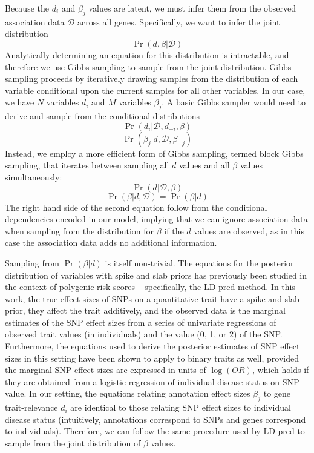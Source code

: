 Because the $d_i$ and $\beta_j$ values are latent, we must infer them
from the observed association data $\mathcal{D}$ across all
genes. Specifically, we want to infer the joint distribution
\[\Pr\left(d,\beta|\mathcal{D}\right)\]
Analytically determining an equation for this distribution is intractable, and therefore
we use Gibbs sampling to sample from the joint distribution. Gibbs
sampling proceeds by iteratively drawing samples from the
distribution of each variable conditional upon the current samples for
all other variables. In our case, we have $N$ variables $d_i$ and $M$
variables $\beta_j$. A basic Gibbs sampler would 
need to derive and sample from the conditional distributions
\[\Pr\left(d_i|\mathcal{D},d_{-i},\beta\right)\]
\[\Pr\left(\beta_j|d,\mathcal{D},\beta_{-j}\right)\]
Instead, we employ a more efficient form of Gibbs sampling, termed
block Gibbs sampling, that iterates between sampling all $d$ values
and all $\beta$ values simultaneously:
\[\Pr\left(d|\mathcal{D},\beta\right)\]
\[\Pr\left(\beta|d,\mathcal{D}\right)=\Pr\left(\beta|d\right)\]
The right hand side of the second equation follow from the
conditional dependencies encoded in our model, implying that we
can ignore association data when sampling from the distribution for
$\beta$ if the $d$ values are observed, as in this case the
association data adds no additional information.

Sampling from $\Pr\left(\beta|d\right)$ is itself non-trivial. The
equations for the posterior distribution of variables with spike and slab
priors has previously been studied in the context of polygenic risk
scores -- specifically, the LD-pred method\cite{}. In this work, the
true effect sizes of SNPs on a quantitative trait have a spike and
slab prior, they affect the trait additively, and the observed data is
the marginal estimates of the SNP effect sizes from a series of
univariate regressions of observed trait values (in individuals) and
the value (0, 1, or 2) of the SNP. Furthermore, the equations used to
derive the posterior estimates of SNP effect sizes in this setting
have been shown to apply to binary traits as well, provided the
marginal SNP effect sizes are expressed in units of $\log(OR)$\cite{}, which
holds if they are obtained from a logistic regression of individual
disease status on SNP value. In our setting, the equations relating
annotation effect sizes $\beta_j$ to gene trait-relevance $d_i$ are
identical to those relating SNP effect sizes to individual disease
status (intuitively, annotations correspond to SNPs and genes
correspond to individuals). Therefore, we can follow the same
procedure used by LD-pred\cite{} to sample from the joint distribution
of $\beta$ values. 

